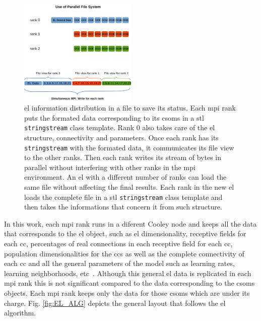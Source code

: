 \documentclass[10pt,journal,compsoc]{IEEEtran}
\begin{document}
\begin{figure}[h!]
    \centering
    \includegraphics[width=0.5\textwidth]{MPI_IO.png}
    \caption{\gls{el} information distribution in a file to save its status. Each \gls{mpi} rank puts the formated data corresponding to its \glspl{csom} in a \gls{stl} \texttt{stringstream} class template. Rank 0 also takes care of the \gls{el} structure, connectivity and parameters. Once each rank has its \texttt{stringstream} with the formated data, it communicates its file view to the other ranks. Then each rank writes its stream of bytes in parallel without interfering with other ranks in the \gls{mpi} environment. An \gls{el} with a different number of ranks can load the same file without affecting the final results. Each rank in the new \gls{el} loads the complete file in a \gls{stl} \texttt{stringstream} class template and then takes the informations that concern it from such structure.}
    \label{fig:MPI_IO}
\end{figure}

In this work, each \gls{mpi} rank runs in a diferent Cooley node and keeps all the data that corresponds to the \gls{el} object, such as \gls{el} dimensionality, receptive fields for each \gls{cc}, percentages of real connections in each receptive field for each \gls{cc}, population dimensionalities for the \glspl{cc} as well as the complete connectivity of each \gls{cc} and all the general parameters of the model such as learning rates, learning neighborhoods, etc~\cite{Dematties2018}. Although this general \gls{el} data is replicated in each \gls{mpi} rank this is not significant compared to the data corresponding to the \glspl{csom} objects. Each \gls{mpi} rank keeps only the data for those \glspl{csom} which are under its charge. Fig. \ref{fig:EL_ALG} depicts the general layout that follows the \gls{el} algorithm.
\end{document}
